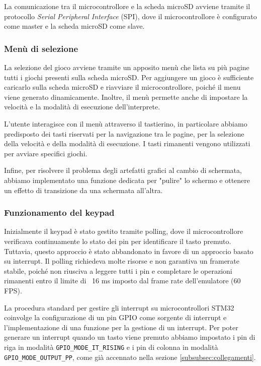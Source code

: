 \documentclass[a4paper]{article}
\begin{document}
La comunicazione tra il microcontrollore e la scheda microSD avviene tramite il protocollo
\textit{Serial Peripheral Interface} (SPI), dove il microcontrollore è configurato come
master e la scheda microSD come slave.

\subsubsection{Menù di selezione}

La selezione del gioco avviene tramite un apposito menù che lista su più pagine tutti i giochi
presenti sulla scheda microSD. Per aggiungere un gioco è sufficiente caricarlo sulla scheda
microSD e riavviare il microcontrollore, poiché il menu viene generato dinamicamente.
Inoltre, il menù permette anche di impostare la velocità e la modalità di esecuzione
dell'interprete.

L'utente interagisce con il menù attraverso il tastierino, in particolare abbiamo predisposto
dei tasti riservati per la navigazione tra le pagine, per la selezione della velocità e
della modalità di esecuzione. I tasti rimanenti vengono utilizzati per avviare specifici giochi.

Infine, per risolvere il problema degli artefatti grafici al cambio di schermata,
abbiamo implementato una funzione dedicata per "pulire" lo schermo e ottenere un effetto
di transizione da una schermata all'altra.

\subsubsection{Funzionamento del keypad}\label{subsubsec:keypad}

Inizialmente il keypad è stato gestito tramite polling, dove il microcontrollore verificava
continuamente lo stato dei pin per identificare il tasto premuto. Tuttavia, questo approccio
è stato abbandonato in favore di un approccio basato su interrupt. Il polling richiedeva
molte risorse e non garantiva un framerate stabile, poiché non riusciva a leggere tutti
i pin e completare le operazioni rimanenti entro il limite di ~16 ms imposto dal frame rate
dell'emulatore (60 FPS).

La procedura standard per gestire gli interrupt su microcontrollori STM32 coinvolge
la configurazione di un pin GPIO come sorgente di interrupt e l'implementazione di
una funzione per la gestione di un interrupt. Per poter generare un interrupt quando
un tasto viene premuto abbiamo impostato i pin di riga in modalità \texttt{GPIO\_MODE\_IT\_RISING}
e i pin di colonna in modalità \texttt{GPIO\_MODE\_OUTPUT\_PP}, come già accennato nella
sezione \ref{subsubsec:collegamenti}.
\end{document}
